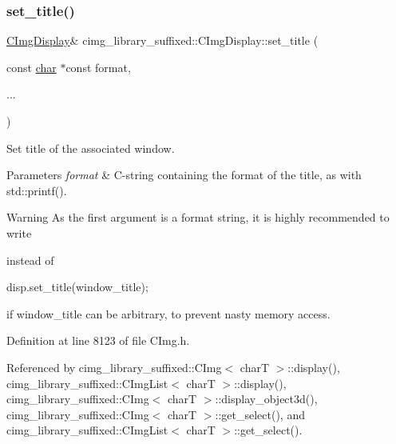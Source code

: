 \subsubsection{\texorpdfstring{set\+\_\+title()}{set\_title()}}
{\footnotesize\ttfamily \hyperlink{structcimg__library__suffixed_1_1CImgDisplay}{C\+Img\+Display}\& cimg\+\_\+library\+\_\+suffixed\+::\+C\+Img\+Display\+::set\+\_\+title (\begin{DoxyParamCaption}\item[{const \hyperlink{classchar}{char} $\ast$const}]{format,  }\item[{}]{... }\end{DoxyParamCaption})\hspace{0.3cm}{\ttfamily [inline]}}



Set title of the associated window. 


\begin{DoxyParams}{Parameters}
{\em format} & C-\/string containing the format of the title, as with {\ttfamily std\+::printf()}. \\
\hline
\end{DoxyParams}
\begin{DoxyWarning}{Warning}
As the first argument is a format string, it is highly recommended to write 
 instead of 
\begin{DoxyCode}
disp.set\_title(window\_title);
\end{DoxyCode}
 if {\ttfamily window\+\_\+title} can be arbitrary, to prevent nasty memory access. 
\end{DoxyWarning}


Definition at line 8123 of file C\+Img.\+h.



Referenced by cimg\+\_\+library\+\_\+suffixed\+::\+C\+Img$<$ char\+T $>$\+::display(), cimg\+\_\+library\+\_\+suffixed\+::\+C\+Img\+List$<$ char\+T $>$\+::display(), cimg\+\_\+library\+\_\+suffixed\+::\+C\+Img$<$ char\+T $>$\+::display\+\_\+object3d(), cimg\+\_\+library\+\_\+suffixed\+::\+C\+Img$<$ char\+T $>$\+::get\+\_\+select(), and cimg\+\_\+library\+\_\+suffixed\+::\+C\+Img\+List$<$ char\+T $>$\+::get\+\_\+select().

